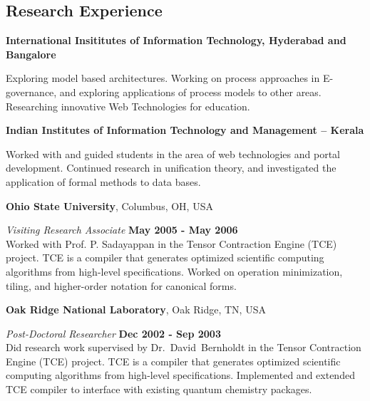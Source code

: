 \documentclass[11pt,margin,line]{res}
\begin{document}
\begin{resume}
\newpage

\section{\sc Research Experience}

{\bf International Insititutes of Information Technology,
  Hyderabad and Bangalore}

\vspace{-.5cm}

Exploring model based architectures.  Working on process
approaches in E-governance, and exploring applications of
process models to other areas.  Researching innovative
Web Technologies for education.  

{\bf Indian Institutes of Information Technology and
  Management -- Kerala} 

\vspace{-.5cm}

Worked with and guided students in the area of web
technologies and portal development.  Continued research in
unification theory, and investigated the application of
formal methods to data bases.


{\bf Ohio State University}, Columbus, OH, USA

\vspace{-.5cm}

{\em Visiting Research Associate\/} \hfill {\bf May 2005 - May 2006}\\
Worked with Prof. P. Sadayappan in the Tensor Contraction
Engine (TCE) project.  TCE is a compiler that generates
optimized scientific computing algorithms from high-level
specifications.  Worked on operation minimization, tiling,
and higher-order notation for canonical forms.

{\bf Oak Ridge National Laboratory}, Oak Ridge, TN, USA

\vspace{-.5cm}

{\em Post-Doctoral Researcher\/} \hfill {\bf Dec 2002 - Sep
  2003}\\
Did research work supervised by Dr.~David~Bernholdt in the
Tensor Contraction Engine (TCE) project.  TCE is a compiler
that generates optimized scientific computing algorithms
from high-level specifications.  Implemented and extended
TCE compiler to interface with existing quantum chemistry
packages.



\end{resume}
\end{document}
